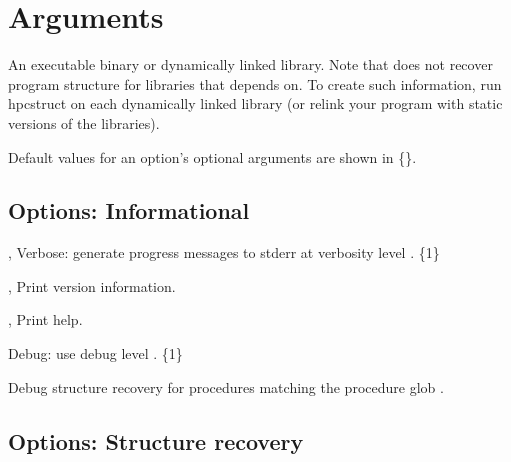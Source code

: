\documentclass[english]{article}
\begin{document}
\section{Arguments}

\begin{Description}
\item[\Arg{binary}] An executable binary or dynamically linked library.
Note that  does not recover program structure for libraries that  depends on.  To create such information, run hpcstruct on each dynamically linked library (or relink your program with static versions of the libraries).
\end{Description}

Default values for an option's optional arguments are shown in \{\}.

\subsection{Options: Informational}

\begin{Description}
\item[\OptoArg{-v}{n}, \OptoArg{--verbose}{n}]
Verbose: generate progress messages to stderr at verbosity level .  \{1\}

\item[\Opt{-V}, \Opt{--version}]
Print version information.

\item[\Opt{-h}, \Opt{--help}]
Print help.

\item[\OptoArg{--debug}{n}]
Debug: use debug level . \{1\}

\item[\OptArg{--debug-proc}{glob}]
Debug structure recovery for procedures matching the procedure glob .
\end{Description}


\subsection{Options: Structure recovery}
\end{document}
